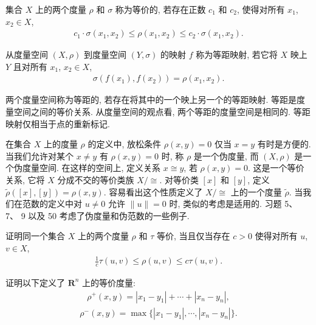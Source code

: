 \documentclass[../../main.tex]{subfiles}
\begin{document}
\begin{definition}[等价度量]\label{definition:ch09-等价度量}
集合 $X$ 上的两个度量 $\rho$ 和 $\sigma$ 称为等价的, 若存在正数 $c_{1}$ 和 $c_{2}$, 使得对所有 $x_{1}$, $x_{2}\in X$,
\begin{align*}
c_{1}\cdot\sigma(x_{1},x_{2})\leqslant\rho(x_{1},x_{2})\leqslant c_{2}\cdot\sigma(x_{1},x_{2}).
\end{align*}
\end{definition}

\begin{definition}[等距映射]\label{definition:ch09-等距映射}
从度量空间 $(X,\rho)$ 到度量空间 $(Y,\sigma)$ 的映射 $f$ 称为等距映射, 若它将 $X$ 映上 $Y$ 且对所有 $x_{1}$, $x_{2}\in X$,
\begin{align*}
\sigma(f(x_{1}),f(x_{2}))=\rho(x_{1},x_{2}).
\end{align*}
\end{definition}

两个度量空间称为等距的, 若存在将其中的一个映上另一个的等距映射. 等距是度量空间之间的等价关系. 从度量空间的观点看, 两个等距的度量空间是相同的. 等距映射仅相当于点的重新标记.

在集合 $X$ 上的度量 $\rho$ 的定义中, 放松条件 $\rho(x,y)=0$ 仅当 $x=y$ 有时是方便的. 当我们允许对某个 $x\neq y$ 有 $\rho(x,y)=0$ 时, 称 $\rho$ 是一个伪度量, 而 $(X,\rho)$ 是一个伪度量空间. 在这样的空间上, 定义关系 $x\cong y$, 若 $\rho(x,y)=0$. 这是一个等价关系, 它将 $X$ 分成不交的等价类族 $X/\cong$. 对等价类 $[x]$ 和 $[y]$, 定义 $\widetilde{\rho}([x],[y])=\rho(x,y)$. 容易看出这个性质定义了 $X/\cong$ 上的一个度量 $\widetilde{\rho}$. 当我们在范数的定义中对 $u\neq 0$ 允许 $\|u\|=0$ 时, 类似的考虑是适用的. 习题 5、 7、 9 以及 50 考虑了伪度量和伪范数的一些例子.

\begin{exercise}\label{exercise:ch09-01}
证明同一个集合 $X$ 上的两个度量 $\rho$ 和 $\tau$ 等价, 当且仅当存在 $c>0$ 使得对所有 $u$, $v\in X$,
\begin{align*}
\frac{1}{c}\tau(u,v)\leqslant\rho(u,v)\leqslant c\tau(u,v).
\end{align*}
\end{exercise}

\begin{exercise}\label{exercise:ch09-02}
证明以下定义了 $\mathbf{R}^{n}$ 上的等价度量:
\begin{align*}
\rho^{+}(x,y)=|x_{1}-y_{1}|+\cdots+|x_{n}-y_{n}|,
\end{align*}
\begin{align*}
\rho^{-}(x,y)=\max\{|x_{1}-y_{1}|,\cdots,|x_{n}-y_{n}|\}.
\end{align*}
\end{exercise}
\end{document}
